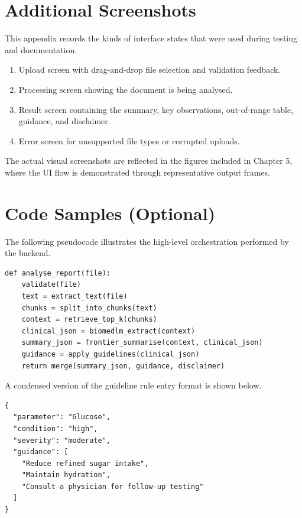 \documentclass[12pt,a4paper]{report}
\begin{document}
\chapter{Additional Screenshots}
This appendix records the kinds of interface states that were used during testing and documentation.

\begin{enumerate}
    \item Upload screen with drag-and-drop file selection and validation feedback.
    \item Processing screen showing the document is being analysed.
    \item Result screen containing the summary, key observations, out-of-range table, guidance, and disclaimer.
    \item Error screen for unsupported file types or corrupted uploads.
\end{enumerate}

The actual visual screenshots are reflected in the figures included in Chapter 5, where the UI flow is demonstrated through representative output frames.

\chapter{Code Samples (Optional)}
The following pseudocode illustrates the high-level orchestration performed by the backend.

\begin{verbatim}
def analyse_report(file):
    validate(file)
    text = extract_text(file)
    chunks = split_into_chunks(text)
    context = retrieve_top_k(chunks)
    clinical_json = biomedlm_extract(context)
    summary_json = frontier_summarise(context, clinical_json)
    guidance = apply_guidelines(clinical_json)
    return merge(summary_json, guidance, disclaimer)
\end{verbatim}

A condensed version of the guideline rule entry format is shown below.

\begin{verbatim}
{
  "parameter": "Glucose",
  "condition": "high",
  "severity": "moderate",
  "guidance": [
    "Reduce refined sugar intake",
    "Maintain hydration",
    "Consult a physician for follow-up testing"
  ]
}
\end{verbatim}
\end{document}
